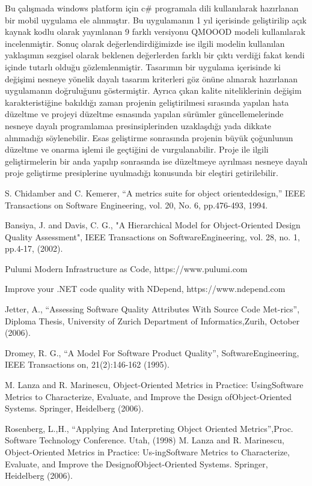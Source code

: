 \documentclass[conference]{IEEEtran}
\begin{document}
Bu çalışmada windows platform için c\# programala dili kullanılarak hazırlanan bir mobil uygulama ele alınmıştır. Bu uygulamanın  1 yıl içerisinde geliştirilip açık kaynak kodlu olarak yayınlanan 9 farklı versiyonu  QMOOOD modeli kullanılarak incelenmiştir. Sonuç olarak değerlendirdiğimizde ise ilgili modelin kullanılan yaklaşımın sezgisel olarak beklenen değerlerden farklı bir çıktı verdiği fakat kendi içinde tutarlı olduğu gözlemlenmiştir. Tasarımın bir uygulama içerisinde ki değişimi nesneye yönelik  dayalı tasarım kriterleri göz önüne alınarak hazırlanan uygulamanın doğruluğunu göstermiştir. Ayrıca çıkan kalite niteliklerinin değişim karakteristiğine bakıldığı zaman projenin geliştirilmesi sırasında yapılan hata düzeltme ve projeyi düzeltme esnasında yapılan sürümler güncellemelerinde nesneye dayalı programlamaa presinsiplerinden uzaklaşdığı yada dikkate alınmadığı söylenebilir. Esas geliştirme sonrasında projenin büyük çoğunlunun düzeltme ve onarma işlemi ile geçtiğini de vurgulanabilir. Proje ile ilgili geliştirmelerin  bir anda yapılıp sonrasında ise düzeltmeye ayrılması nesneye dayalı proje geliştirme presiplerine uyulmadığı konusunda bir eleştiri getirilebilir.


\vspace{240}
\begin{thebibliography}{1}
S.  Chidamber  and  C.  Kemerer,  “A  metrics  suite  for  object  orienteddesign,” IEEE Transactions on Software Engineering, vol. 20, No. 6, pp.476-493, 1994.

Bansiya,   J.   and   Davis,   C.   G.,   "A   Hierarchical   Model   for  Object-Oriented  Design  Quality  Assessment",  IEEE  Transactions  on  SoftwareEngineering, vol. 28, no. 1, pp.4-17, (2002).

Pulumi Modern Infrastructure as Code, https://www.pulumi.com

Improve your .NET code quality with NDepend, https://www.ndepend.com

Jetter, A., “Assessing Software Quality Attributes With Source Code Met-rics”, Diploma Thesis, University of Zurich Department of Informatics,Zurih, October (2006).

Dromey,  R.  G.,  “A  Model  For  Software  Product  Quality”,  SoftwareEngineering, IEEE Transactions on, 21(2):146-162 (1995).

M. Lanza and R. Marinescu, Object-Oriented Metrics in Practice: UsingSoftware Metrics to Characterize, Evaluate, and Improve the Design ofObject-Oriented Systems. Springer, Heidelberg (2006).

Rosenberg, L.,H., “Applying And Interpreting Object Oriented Metrics”,Proc. Software Technology Conference. Utah, (1998)
M.  Lanza  and  R.  Marinescu,  Object-Oriented  Metrics  in  Practice:  Us-ingSoftware Metrics to Characterize, Evaluate, and Improve the DesignofObject-Oriented Systems. Springer, Heidelberg (2006).

\end{thebibliography}
\end{document}
